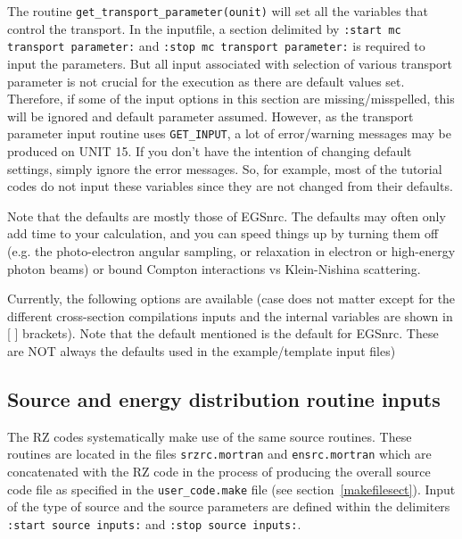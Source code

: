 \documentclass[12pt,twoside]{article}  %
\begin{document}
The routine \verb+get_transport_parameter(ounit)+ will set all
the variables that control the transport. In the inputfile, a section
delimited by \verb+:start mc transport parameter:+ and
\verb+:stop mc transport parameter:+ is required to input the parameters.
But all input associated with selection of various transport parameter
is not crucial for the execution as there are default values set.
Therefore, if some of the input options in this section are
missing/misspelled, this will be ignored and default parameter assumed.
However, as the transport parameter input routine uses \verb+GET_INPUT+, a lot
of error/warning messages may be produced on UNIT 15.
If you don't have the intention of changing default settings,
simply ignore the error messages. So, for example, most of the tutorial
codes do not input these variables since they are not changed from their
defaults.

Note that the defaults are mostly those of EGSnrc.  The defaults may
often only add time to your calculation, and you can speed things up by
turning them off (e.g. the photo-electron angular sampling, or relaxation
in electron or high-energy photon beams) or bound Compton interactions
vs Klein-Nishina scattering.


  Currently, the following options are available (case does not matter
except for the different cross-section compilations inputs and
the internal variables are shown in [ ] brackets).
Note that the default mentioned is the default  for EGSnrc. These are
NOT always the defaults
used in the example/template input files)



\newpage      %

\subsection{Source and energy distribution routine inputs}
\label{source_inputs}

The RZ codes systematically make use of the same source routines.
These routines are located in the files \verb+srzrc.mortran+
and \verb+ensrc.mortran+ which are concatenated with the RZ code
in the process of producing the overall source code file as specified in
the \verb+user_code.make+ file (see section~\ref{makefilesect}).
Input of the type of source and the source parameters are defined
within the delimiters \verb+:start source inputs:+ and
\verb+:stop source inputs:+.
\end{document}
